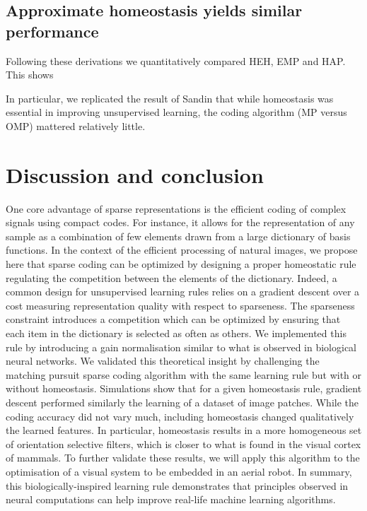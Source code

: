 \documentclass[a4paper, 11pt, draft]{article} %
\begin{document}
\subsection{Approximate homeostasis yields similar performance}
Following these derivations we quantitatively compared HEH, EMP and HAP. This shows 

In particular, we replicated the result of Sandin that while homeostasis was essential in improving unsupervised learning, the coding algorithm (MP versus OMP) mattered relatively little. 



\section{Discussion and conclusion}\label{discussion-et-conclusion}



%
One core advantage of sparse representations is the efficient coding of complex signals using compact codes. For instance, it allows for the representation of any sample as a combination of few elements drawn from a large dictionary of basis functions. In the context of the efficient processing of natural images, we propose here that sparse coding can be optimized by designing a proper homeostatic rule regulating the competition between the elements of the dictionary. Indeed, a common design for unsupervised learning rules relies on a gradient descent over a cost measuring representation quality with respect to sparseness. The sparseness constraint introduces a competition which can be optimized by ensuring that each item in the dictionary is selected as often as others. We implemented this rule by introducing a gain normalisation similar to what is observed in biological neural networks. We validated this theoretical insight by challenging the matching pursuit sparse coding algorithm with the same learning rule but with or without homeostasis. Simulations show that for a given homeostasis rule, gradient descent performed similarly the learning of a dataset of image patches. While the coding accuracy did not vary much, including homeostasis changed qualitatively the learned features. In particular, homeostasis results in a more homogeneous set of orientation selective filters, which is closer to what is found in the visual cortex of mammals. To further validate these results, we will apply this algorithm to the optimisation of a visual system to be embedded in an aerial robot. In summary, this biologically-inspired learning rule demonstrates that principles observed in neural computations can help improve real-life machine learning algorithms. 
\end{document}
